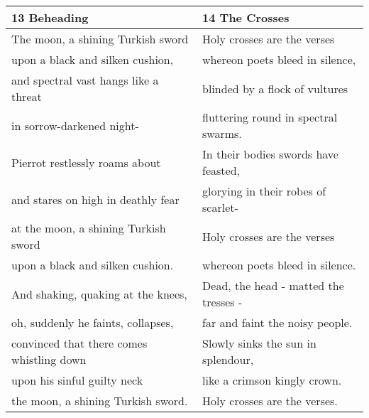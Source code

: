\newpage
\begin{table}[h!]
\begin{tabular}{p{8.0cm}|p{8.0cm}} \hline

13 Beheading& 14 The Crosses\\\hline
The moon, a shining Turkish sword& Holy crosses are the verses\\
upon a black and silken cushion,& whereon poets bleed in silence,\\
and spectral vast hangs like a threat & blinded by a flock of vultures\\
in sorrow-darkened night-& fluttering round in spectral swarms.\\
Pierrot restlessly roams about& In their bodies swords have feasted,\\
and stares on high in deathly fear& glorying in their robes of scarlet- \\
at the moon, a shining Turkish sword& Holy crosses are the verses\\
upon a black and silken cushion.& whereon poets bleed in silence.\\
And shaking, quaking at the knees,& Dead, the head - matted the tresses - \\
oh, suddenly he faints, collapses,& far and faint the noisy people.\\
convinced that there comes whistling down& Slowly sinks the sun in splendour,\\
upon his sinful guilty neck& like a crimson kingly crown.\\
the moon, a shining Turkish sword.& Holy crosses are the verses.\\\hline 


\end{tabular}
\end{table}

